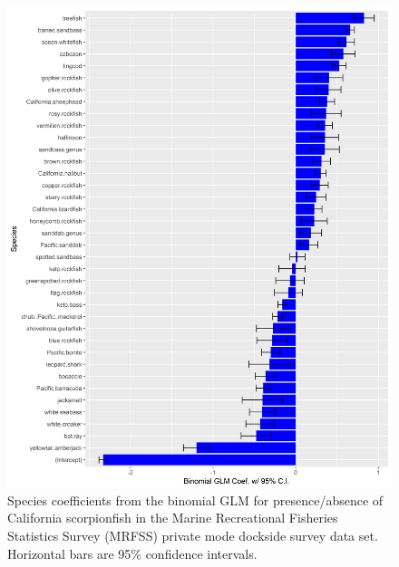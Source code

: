 \documentclass[12pt,]{article}
\begin{document}
\begin{figure}[htbp]
\centering
\includegraphics{Figures/Fleet4_RecPR_SMcoef.png}
\caption{Species coefficients from the binomial GLM for presence/absence
of California scorpionfish in the Marine Recreational Fisheries
Statistics Survey (MRFSS) private mode dockside survey data set.
Horizontal bars are 95\% confidence intervals.
\label{fig:Fleet4_RecPR_dockside_SM}}
\end{figure}
\end{document}

